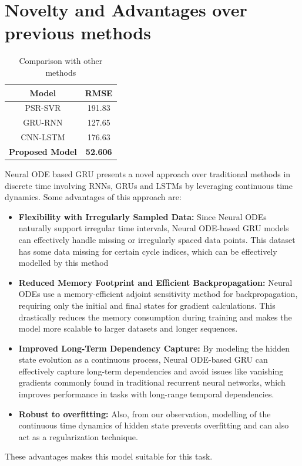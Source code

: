 \documentclass[12pt]{article}
\begin{document}
	\section{\large{Novelty and Advantages over previous methods}}
	\begin{table}[h]
		\centering
		\begin{tabular}{|c|c|}
			\hline
			Model & RMSE \\
			\hline
			PSR-SVR & 191.83 \\
			\hline
			GRU-RNN & 127.65 \\
			\hline
			CNN-LSTM & 176.63 \\
			\hline
			\textbf{Proposed Model} & \textbf{52.606} \\
			\hline
		\end{tabular}
		\caption{Comparison with other methods}
		\label{tab:comparison}
	\end{table}
	Neural ODE based GRU presents a novel approach over traditional methods in discrete time involving RNNs, GRUs and LSTMs by leveraging continuous time dynamics. Some advantages of this approach are:
	\begin{itemize}
		\item \textbf{Flexibility with Irregularly Sampled Data:} Since Neural ODEs naturally support irregular time intervals, Neural ODE-based GRU models can effectively handle missing or irregularly spaced data points. This dataset has some data missing for certain cycle indices, which can be effectively modelled by this method
		
		\item \textbf{Reduced Memory Footprint and Efficient Backpropagation:} Neural ODEs use a memory-efficient adjoint sensitivity method for backpropagation, requiring only the initial and final states for gradient calculations. This drastically reduces the memory consumption during training and makes the model more scalable to larger datasets and longer sequences.
		
		\item \textbf{Improved Long-Term Dependency Capture:} By modeling the hidden state evolution as a continuous process, Neural ODE-based GRU can effectively capture long-term dependencies and avoid issues like vanishing gradients commonly found in traditional recurrent neural networks, which improves performance in tasks with long-range temporal dependencies.
		
		\item \textbf{Robust to overfitting:} Also, from our observation, modelling of the continuous time dynamics of hidden state prevents overfitting and can also act as a regularization technique.
	\end{itemize}
	These advantages makes this model suitable for this task.
\end{document}
